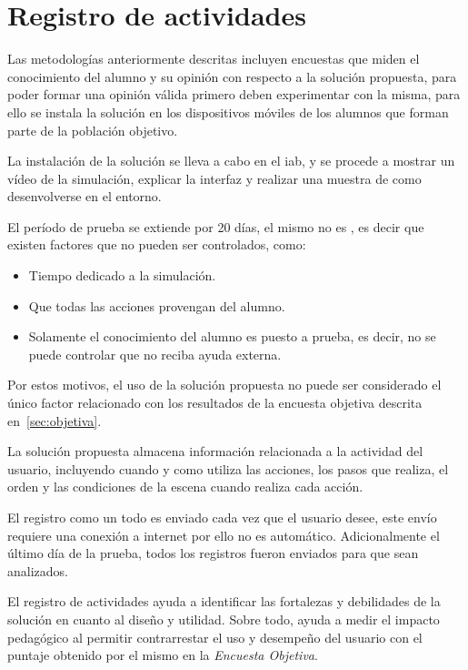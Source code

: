 
\section{Registro de actividades}
\label{sec:registro}

Las metodologías anteriormente descritas incluyen encuestas que miden
el conocimiento del alumno y su opinión con respecto a la solución propuesta,
para poder formar una opinión válida primero deben experimentar con la misma, para
ello se instala la solución en los dispositivos móviles de los alumnos que forman 
parte de la población objetivo.

La instalación de la solución se lleva a cabo en el \Gls{iab}, y se procede 
a mostrar un vídeo de la simulación, explicar la interfaz y realizar una muestra 
de como desenvolverse en el entorno.

El período de prueba se extiende por 20 días, el mismo no es
, es decir que existen factores que no pueden ser
controlados, como:

\begin{itemize}
    \item Tiempo dedicado a la simulación.
    \item Que todas las acciones provengan del alumno.
    \item Solamente el conocimiento del alumno es puesto a prueba, es decir, no
        se puede controlar que no reciba ayuda externa.
\end{itemize}

Por estos motivos, el uso de la solución propuesta no puede ser considerado
el único factor relacionado con los resultados de la encuesta objetiva
descrita en~\ref{sec:objetiva}.

La solución propuesta almacena información relacionada a la actividad del
usuario, incluyendo cuando y como utiliza las acciones, los pasos que realiza,
el orden y las condiciones de la escena cuando realiza cada acción.

El registro como un todo es enviado cada vez que el usuario desee, este envío
requiere una conexión a internet por ello no es automático. Adicionalmente el
último día de la prueba, todos los registros fueron enviados para que sean
analizados.

El registro de actividades ayuda a identificar las  fortalezas y debilidades 
de la solución en cuanto al diseño y utilidad. Sobre todo, ayuda a medir 
el impacto pedagógico al permitir contrarrestar el uso y desempeño del usuario 
con el puntaje obtenido por el mismo en la \emph{Encuesta Objetiva}.

